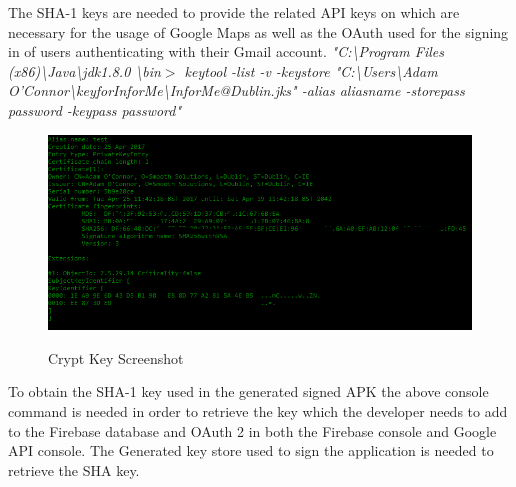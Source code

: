\par The SHA-1 keys are needed to provide the related API keys on which are necessary for the usage of Google Maps as well as the OAuth used for the signing in of users authenticating with their Gmail account.
\newline
\textit{"C:\textbackslash Program Files (x86)\textbackslash Java\textbackslash jdk1.8.0 \textbackslash bin$>$ keytool -list -v -keystore "C:\textbackslash Users\textbackslash Adam O'Connor\textbackslash keyforInforMe\textbackslash InforMe@Dublin.jks" -alias     alias\textunderscore name -storepass password -keypass password"}

\begin{figure}[htbp]
    \center \includegraphics[width=450pt]{Hashkeys}\\
    \caption{Crypt Key Screenshot} \label{Figure: Crypt Key Screenshot}
\end{figure}

To obtain the SHA-1 key used in the generated signed APK the above console command is needed in order to retrieve the key which the developer needs to add to the Firebase database and OAuth 2 in both the Firebase console and Google API console. The Generated key store used to sign the application is needed to retrieve the SHA key. 

